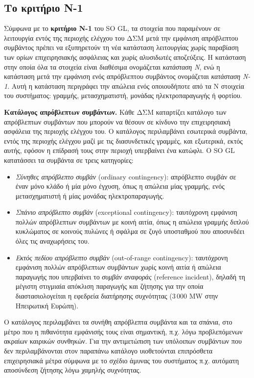 \subsection{Το κριτήριο N-1}
\label{sec:n1}

Σύμφωνα με το \textbf{κριτήριο N-1} του SO GL, τα στοιχεία που παραμένουν σε λειτουργία
εντός της περιοχής ελέγχου του ΔΣΜ μετά την εμφάνιση απρόβλεπτου συμβάντος πρέπει να
εξυπηρετούν τη νέα κατάσταση λειτουργίας χωρίς παραβίαση των ορίων επιχειρησιακής ασφάλειας
και χωρίς αλυσιδωτές αποζεύξεις. Η κατάσταση στην οποία όλα τα στοιχεία είναι διαθέσιμα ονομάζεται \emph{κατάσταση N}, ενώ η κατάσταση μετά την
εμφάνιση ενός απρόβλεπτου συμβάντος ονομάζεται \emph{κατάσταση N-1}. Αυτή η κατάσταση περιγράφει την απώλεια ενός οποιουδήποτε από τα N στοιχεία του
συστήματος: γραμμής, μετασχηματιστή, μονάδας ηλεκτροπαραγωγής ή φορτίου.

\textbf{Κατάλογος απρόβλεπτων συμβάντων.} Κάθε ΔΣΜ καταρτίζει κατάλογο των απρόβλεπτων συμβάντων που μπορούν να θέσουν σε κίνδυνο την
επιχειρησιακή ασφάλεια της περιοχής ελέγχου του. Ο κατάλογος περιλαμβάνει εσωτερικά συμβάντα,
εντός της περιοχής ελέγχου μαζί με τις διασυνδετικές γραμμές, και εξωτερικά, εκτός αυτής, εφόσον
η επίδρασή τους στην περιοχή υπερβαίνει ένα κατώφλι. Ο SO GL κατατάσσει τα συμβάντα σε τρεις κατηγορίες:

\begin{itemize}
\item \emph{Σύνηθες απρόβλεπτο συμβάν} (ordinary contingency): απρόβλεπτο συμβάν σε έναν
      μόνο κλάδο ή μία μόνο έγχυση, όπως η απώλεια μίας γραμμής, ενός μετασχηματιστή ή μίας
      μονάδας ηλεκτροπαραγωγής.
\item \emph{Σπάνιο απρόβλεπτο συμβάν} (exceptional contingency): ταυτόχρονη εμφάνιση πολλών
      απρόβλεπτων συμβάντων με κοινή αιτία, όπως η απώλεια γραμμής διπλού κυκλώματος σε κοινούς
      πυλώνες ή σφάλμα σε ζυγό υποσταθμού που αποσυνδέει όλες τις αναχωρήσεις του.
\item \emph{Εκτός πεδίου απρόβλεπτο συμβάν} (out-of-range contingency): ταυτόχρονη εμφάνιση
      πολλών απρόβλεπτων συμβάντων χωρίς κοινή αιτία ή απώλεια παραγωγής που υπερβαίνει το
      \emph{συμβάν αναφοράς} (reference incident), δηλαδή τη μέγιστη στιγμιαία απόκλιση
      παραγωγής και ζήτησης για την οποία διαστασιολογείται η εφεδρεία διατήρησης συχνότητας
      (3\,000 MW στην Ηπειρωτική Ευρώπη).
\end{itemize}

Ο κατάλογος περιλαμβάνει τα συνήθη απρόβλεπτα συμβάντα και τα σπάνια, στο μέτρο που η πιθανότητα εμφάνισής τους είναι σημαντική, π.χ. λόγω προβλεπόμενων ακραίων καιρικών συνθηκών. Για την αντιμετώπιση των υπόλοιπων συμβάντων που δεν περιλαμβάνονται στον παραπάνω κατάλογο υιοθετούνται επιπρόσθετα επιχειρησιακά μέτρα σύμφωνα με το σχέδιο άμυνας του συστήματος π.χ. αυτόματη αποσύνδεση ζήτησης λόγω χαμηλής συχνότητας.

